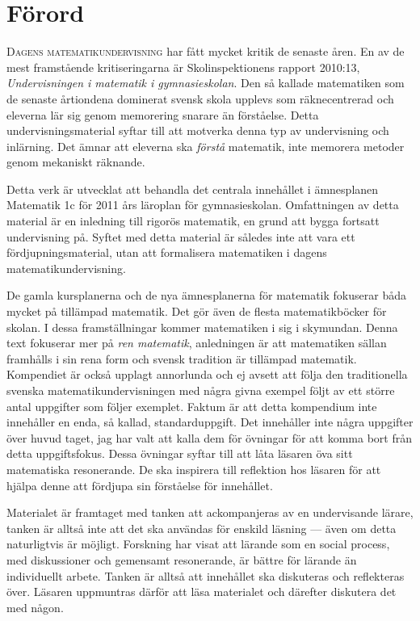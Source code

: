 \chapter*{Förord}
\lettrine{D}{agens matematikundervisning} har fått mycket kritik de senaste
åren.
En av de mest framstående kritiseringarna är Skolinspektionens rapport 2010:13,
\emph{Undervisningen i matematik i gymnasieskolan}.
Den så kallade matematiken som de senaste årtiondena dominerat svensk skola
upplevs som räknecentrerad och eleverna lär sig genom memorering snarare än
förståelse.
Detta undervisningsmaterial syftar till att motverka denna typ av undervisning 
och inlärning.
Det ämnar att eleverna ska \emph{förstå} matematik, inte memorera metoder genom
mekaniskt räknande.

Detta verk är utvecklat att behandla det centrala innehållet i ämnesplanen 
Matematik 1c för 2011 års läroplan för gymnasieskolan.
Omfattningen av detta material är en inledning till rigorös matematik, en grund
att bygga fortsatt undervisning på.
Syftet med detta material är således inte att vara ett fördjupningsmaterial,
utan att formalisera matematiken i dagens matematikundervisning.

De gamla kursplanerna och de nya ämnesplanerna för matematik fokuserar båda
mycket på tillämpad matematik.
Det gör även de flesta matematikböcker för skolan.
I dessa framställningar kommer matematiken i sig i skymundan.
Denna text fokuserar mer på \emph{ren matematik}, anledningen är att
matematiken sällan framhålls i sin rena form och svensk tradition är tillämpad
matematik.
Kompendiet är också upplagt annorlunda och ej avsett att följa den
traditionella svenska matematikundervisningen med några givna exempel följt av
ett större antal uppgifter som följer exemplet.
Faktum är att detta kompendium inte innehåller en enda, så kallad,
standarduppgift.
Det innehåller inte några uppgifter över huvud taget, jag har valt att kalla
dem för övningar för att komma bort från detta uppgiftsfokus.
Dessa övningar syftar till att låta läsaren öva sitt matematiska resonerande.
De ska inspirera till reflektion hos läsaren för att hjälpa denne att fördjupa 
sin förståelse för innehållet.

Materialet är framtaget med tanken att ackompanjeras av en undervisande lärare,
tanken är alltså inte att det ska användas för enskild läsning --- även om 
detta naturligtvis är möjligt.
Forskning har visat att lärande som en social process, med diskussioner och
gemensamt resonerande, är bättre för lärande än individuellt arbete.
Tanken är alltså att innehållet ska diskuteras och reflekteras över.
Läsaren uppmuntras därför att läsa materialet och därefter diskutera det med 
någon.

